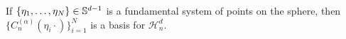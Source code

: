 \begin{theorem}
    If $\{\eta_1, \ldots, \eta_N \} \in \mathbb{S}^{d-1}$ is a fundamental system of points on the sphere, then $\{C_n^{(\alpha)}(\eta_i \cdot)\}_{i=1}^N$ is a basis for $\mathcal{H}_n^d$.
\end{theorem}






